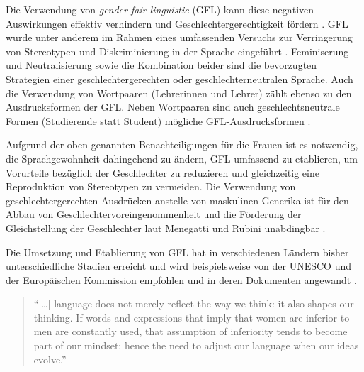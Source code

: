 \documentclass[12pt, 
    twoside=false, 
    bibliography=totoc, 
    numbers=endperiod, 
    headings=normal, 
    toc=chapterentrydotfill
    ]{scrbook}
\begin{document}
Die Verwendung von \emph{gender-fair linguistic} (GFL) kann diese negativen Auswirkungen effektiv verhindern und Geschlechtergerechtigkeit fördern \parencite[1]{menegatti_2017}.
 GFL wurde unter anderem im Rahmen eines umfassenden Versuchs zur Verringerung von Stereotypen und Diskriminierung in der Sprache eingeführt \parencite[2]{sczesny_2016}.  Feminiserung und Neutralisierung sowie die Kombination beider sind die bevorzugten Strategien einer geschlechtergerechten oder geschlechterneutralen Sprache. Auch die Verwendung von Wortpaaren (Lehrerinnen und Lehrer) zählt ebenso zu den Ausdrucksformen der GFL. Neben Wortpaaren sind auch geschlechtsneutrale Formen (Studierende statt Student) mögliche GFL-Ausdrucksformen \parencite[2]{sczesny_2016}.

Aufgrund der oben genannten Benachteiligungen für die Frauen ist es notwendig, die Sprachgewohnheit dahingehend zu ändern, GFL umfassend zu etablieren, um Vorurteile bezüglich der Geschlechter zu reduzieren und gleichzeitig eine Reproduktion von Stereotypen zu vermeiden. Die Verwendung von geschlechtergerechten Ausdrücken anstelle von maskulinen Generika ist für den Abbau von Geschlechtervoreingenommenheit und die Förderung der Gleichstellung der Geschlechter laut Menegatti und Rubini unabdingbar \parencite*{menegatti_2017}.

Die Umsetzung und Etablierung von GFL hat in verschiedenen Ländern bisher unterschiedliche Stadien erreicht und wird beispielsweise von der UNESCO und der Europäischen Kommission empfohlen und in deren Dokumenten angewandt \parencite[4]{sczesny_2016}.

\citereset
\begin{quote}
    \enquote{[…] language does not merely reflect the way we think: it also shapes our thinking. If words and expressions that imply that women are inferior to men are constantly used, that assumption of inferiority tends to become part of our mindset; hence the need to adjust our language when our ideas evolve.} \parencite {unesco_2011} 
\end{quote}

\end{document}
